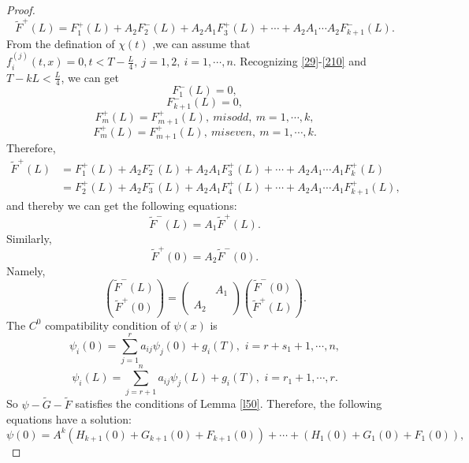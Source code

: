 \documentclass[a4paper,reqno,11pt]{amsart}
\numberwithin{equation}{section} %
\begin{document}
\begin{proof}
$$$$
$$
\tilde{F}^+  (L) =F^+ _1 (L) +A_2 F^- _2 (L) +A_2 A_1 F^+ _3 (L)  +\cdots +A_2 A_1 \cdots A_2 F^- _{k+1} (L) .
$$
From the defination of $\chi (t)$ ,we can assume that $f^{(j)}_i(t,x)=0,t < T-\frac{L}{4},\ j=1,2,\ i=1,\cdots,n$. Recognizing \eqref{29}-\eqref{210} and $T-kL < \frac{L}{4}$, we can get 
$$
F^- _{1}(L)=0,
$$
$$
F^- _{k+1}(L)=0,
$$
$$
F^+ _{m}(L) =F^+ _{m+1}(L) ,\ m is odd ,\ m=1,\cdots ,k,
$$
$$
F^+ _{m}(L) =F^+ _{m+1}(L) ,\ m is even ,\ m=1,\cdots ,k.
$$
Therefore,
\begin{equation}
	\begin{aligned}
		\tilde{F}^+  (L) &=F^+ _1 (L) +A_2 F^- _2 (L) +A_2 A_1 F^+ _3 (L)  +\cdots +A_2 A_1 \cdots A_1 F^+ _{k} (L) \\
		                 &=F^+ _2 (L) +A_2 F^- _3 (L) +A_2 A_1 F^+ _4 (L)  +\cdots +A_2 A_1 \cdots A_1 F^+ _{k+1} (L) ,
	\end{aligned}
\end{equation}
and thereby we can get the following equations:
$$
\tilde{F}^-  (L) =A_1 \tilde{F} ^+  (L) .
$$
Similarly,
$$
\tilde{F}^+  (0) =A_2 \tilde{F} ^-  (0) .
$$
Namely, 
\begin{equation}\label{compatibility condition of F}
    \binom{\tilde{F} ^{-}(L)}{\tilde{F}^{+}(0)}=\left(\begin{array}{ll} 
        & A_1 \\
        A_2 &
    \end{array}\right)\binom{\tilde{F}^{-}(0)}{\tilde{F} ^{+}(L)}.
\end{equation}
The $C^0$ compatibility condition of $\psi(x)$ is
\begin{equation}\label{21}
    \psi _i\left( 0 \right) =\sum_{j=1}^r{a_{ij}\psi _j\left( 0 \right) + g_i(T),\,\,i=r+s_1+1,\cdots ,n},
\end{equation}
\begin{equation}\label{22}
    \psi _i\left( L \right) =\sum_{j=r+1}^n{a_{ij}\psi _j\left( L \right) +g_i(T),\,\,i=r_1+1,\cdots ,r}.
\end{equation}
So $\psi -\tilde{G} -\tilde{F} $ satisfies the conditions of Lemma \ref{l50}. Therefore, the following equations have a solution:
\begin{equation}\label{c0 continuity at 0}
\psi\left( 0 \right) =A^k\left( H_{k+1}\left( 0 \right) +G_{k+1}\left( 0 \right)+F_{k+1}\left( 0 \right) \right)  +\cdots +\left( H_1\left( 0 \right) +G_1\left( 0 \right)+F_1\left( 0 \right) \right) ,
\end{equation}
\begin{equation}\label{c0 continuity at L}

\end{equation}
\end{proof}
\end{document}
